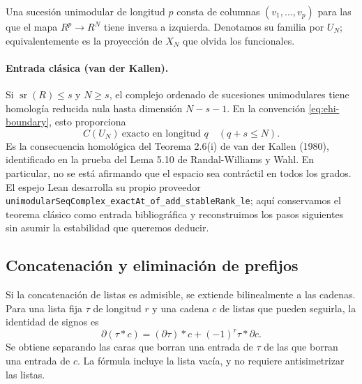 Una sucesión unimodular de longitud $p$ consta de columnas $(v_1,\ldots,v_p)$ para las que el mapa $R^p\to R^N$ tiene inversa a izquierda. Denotamos su familia por $U_N$; equivalentemente es la proyección de $X_N$ que olvida los funcionales.

\paragraph{Entrada clásica (van der Kallen).} Si $\operatorname{sr}(R)\le s$ y $N\ge s$, el complejo ordenado de sucesiones unimodulares tiene homología reducida nula hasta dimensión $N-s-1$. En la convención \eqref{eq:ehi-boundary}, esto proporciona
\begin{equation}
 C(U_N)\ \text{exacto en longitud }q\quad(q+s\le N).
 \label{eq:ehi-uni}
\end{equation}
Es la consecuencia homológica del Teorema 2.6(i) de van der Kallen (1980), identificado en la prueba del Lema 5.10 de Randal-Williams y Wahl. En particular, no se está afirmando que el espacio sea contráctil en todos los grados. El espejo Lean desarrolla su propio proveedor \texttt{unimodularSeqComplex\_exactAt\_of\_add\_stableRank\_le}; aquí conservamos el teorema clásico como entrada bibliográfica y reconstruimos los pasos siguientes sin asumir la estabilidad que queremos deducir.

\subsection{Concatenación y eliminación de prefijos}

Si la concatenación de listas es admisible, se extiende bilinealmente a las cadenas. Para una lista fija $\tau$ de longitud $r$ y una cadena $c$ de listas que pueden seguirla, la identidad de signos es
\begin{equation}
 \partial(\tau*c)=(\partial\tau)*c+(-1)^r\tau*\partial c.
 \label{eq:ehi-concat}
\end{equation}
Se obtiene separando las caras que borran una entrada de $\tau$ de las que borran una entrada de $c$. La fórmula incluye la lista vacía, y no requiere antisimetrizar las listas.

